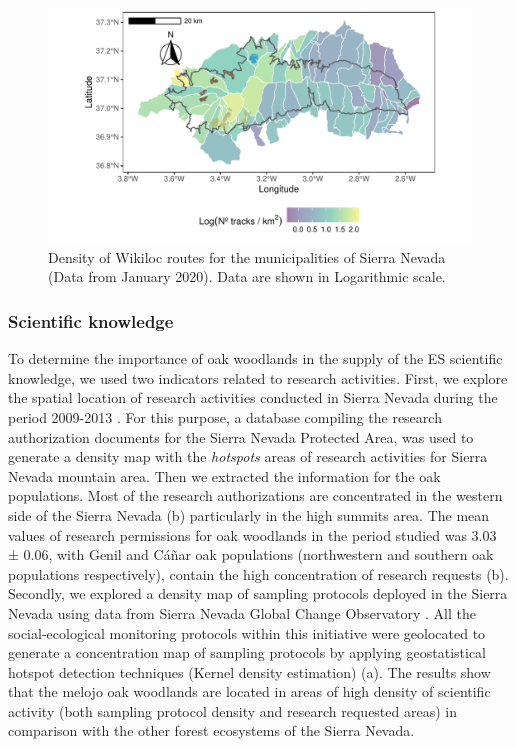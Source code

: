 \begin{figure}
    \centering
    \includegraphics[width=\textwidth]{img/es/es-wikiloc.pdf}\caption{Density of Wikiloc routes for the municipalities of Sierra Nevada (Data from January 2020). Data are shown in Logarithmic scale.}\label{fig:es:wikiloc}
\end{figure}

\subsubsection{Scientific knowledge}\label{sec:es:cultural-scientific} 
To determine the importance of oak woodlands in the supply of the ES scientific knowledge, we used two indicators related to research activities. First, we explore the spatial location of research activities conducted in Sierra Nevada during the period 2009-2013 \autocites{Zamoraetal2017MonitoringGlobal}. For this purpose, a database compiling the research authorization documents for the Sierra Nevada Protected Area, was used to generate a density map with the \emph{hotspots} areas of research activities for Sierra Nevada mountain area. Then we extracted the information for the oak populations. Most of the research authorizations are concentrated in the western side of the Sierra Nevada (b) particularly in the high summits area. The mean values of research permissions for oak woodlands in the period studied was 3.03 ± 0.06, with Genil and Cáñar oak populations (northwestern and southern oak populations respectively), contain the high concentration of research requests (b). 
Secondly, we explored a density map of sampling protocols deployed in the Sierra Nevada \autocites{Zamoraetal2017MonitoringGlobal} using data from Sierra Nevada Global Change Observatory \autocites{Zamoraetal2016GlobalChange}. All the social-ecological monitoring protocols within this initiative were geolocated to generate a concentration map of sampling protocols by applying geostatistical hotspot detection techniques (Kernel density estimation) \autocites{Zamoraetal2016GlobalChange} (a). The results show that the melojo oak woodlands are located in areas of high density of scientific activity (both sampling protocol density and research requested areas) in comparison with the other forest ecosystems of the Sierra Nevada.

